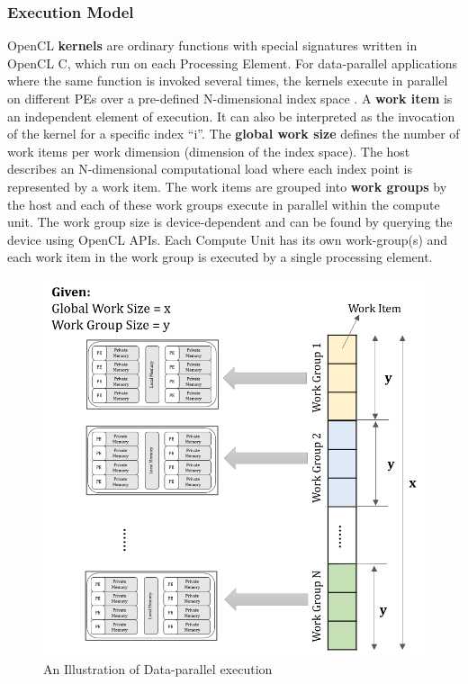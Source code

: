 \subsubsection{Execution Model}
\label{2_3_1_3}
OpenCL \textbf{kernels} are ordinary functions with special signatures written in OpenCL C, which run on each Processing Element. For data-parallel applications where the same function is invoked several times, the kernels execute in parallel on different PEs over a pre-defined N-dimensional index space \cite{tompson2012introduction}. \newline \newline
A \textbf{work item} is an independent element of execution. It can also be interpreted as the invocation of the kernel for a specific index “i”. The \textbf{global work size} defines the number of work items per work dimension (dimension of the index space).\newline \newline
The host describes an N-dimensional computational load where each index point is represented by a work item. The work items are grouped into \textbf{work groups} by the host and each of these work groups execute in parallel within the compute unit. The work group size is device-dependent and can be found by querying the device using OpenCL APIs. 
Each Compute Unit has its own work-group(s) and each work item in the work group is executed by a single processing element.

\begin{figure}[h!]
  \centering
  \includegraphics[width=0.70\linewidth]{figures/openCL_workSchedule.png}
  \caption{An Illustration of Data-parallel execution
  \cite{opencl_ajg}}
  \label{fig:openCL_workSchedule}
\end{figure}

